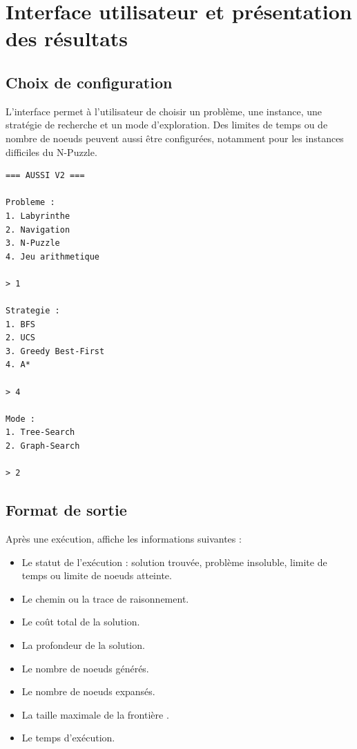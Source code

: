 \section{Interface utilisateur et présentation des résultats}

\subsection{Choix de configuration}

L'interface permet à l'utilisateur de choisir un problème, une instance, une
stratégie de recherche et un mode d'exploration. Des limites de temps ou de
nombre de noeuds peuvent aussi être configurées, notamment pour les instances
difficiles du N-Puzzle.

\begin{lstlisting}[caption={Exemple d'une session utilisateur.}]
=== AUSSI V2 ===

Probleme :
1. Labyrinthe
2. Navigation
3. N-Puzzle
4. Jeu arithmetique

> 1

Strategie :
1. BFS
2. UCS
3. Greedy Best-First
4. A*

> 4

Mode :
1. Tree-Search
2. Graph-Search

> 2
\end{lstlisting}

\subsection{Format de sortie}

Après une exécution, \AUSSI{} affiche les informations suivantes :

\begin{itemize}
    \item Le statut de l'exécution : solution trouvée, problème insoluble,
    limite de temps ou limite de noeuds atteinte.
    \item Le chemin ou la trace de raisonnement.
    \item Le coût total de la solution.
    \item La profondeur de la solution.
    \item Le nombre de noeuds générés.
    \item Le nombre de noeuds expansés.
    \item La taille maximale de la frontière .
    \item Le temps d'exécution.
\end{itemize}

